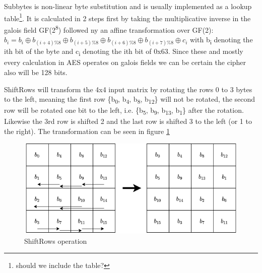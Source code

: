 \documentclass[a4paper]{article}
\begin{document}
Subbytes is non-linear byte substitution and is usually implemented as a lookup table\footnote{should we include the table?}. It is calculated in 2 steps first by taking the multiplicative inverse in the galois field GF(2\textsuperscript{8}) followed ny an affine transformation over GF(2):
\(b_i = b_i \oplus b_{(i+4) \% 8} \oplus b_{(i+5) \% 8} \oplus b_{(i+6) \% 8} \oplus b_{(i+7) \% 8} \oplus c_i\) with b\textsubscript{i} denoting the ith bit of the byte and c\textsubscript{i} denoting the ith bit of 0x63. Since these and mostly every calculation in AES operates on galois fields we can be certain the cipher also will be 128 bits.

ShiftRows will transform the 4x4 input matrix by rotating the rows 0 to 3 bytes to the left, meaning the first row \{b\textsubscript{0}, b\textsubscript{4}, b\textsubscript{8}, b\textsubscript{12}\} will not be rotated, the second row will be rotated one bit to the left, i.e. \{b\textsubscript{5}, b\textsubscript{9}, b\textsubscript{13}, b\textsubscript{1}\} after the rotation. Likewise the 3rd row is shifted 2 and the last row is shifted 3 to the left (or 1 to the right). The transformation can be seen in figure \ref{fig:ShiftRows}


\begin{figure}[htbp]
\centering
\includegraphics[width=.9\linewidth]{./Background/shiftRows.png}
\caption{\label{fig:ShiftRows}ShiftRows operation}
\end{figure}
\end{document}
